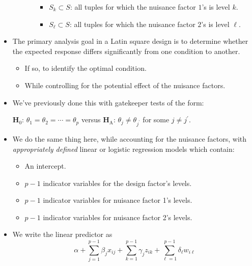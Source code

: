 \begin{itemize}
\begin{itemize}
\begin{itemize}
\begin{itemize}
                                          \item $ S_k\subset S $: all tuples for which the nuisance factor $ 1 $'s is level $ k $.
                                          \item $ S_\ell\subset S $: all tuples for which the nuisance factor $ 2 $'s is level $ \ell $.
                                    \end{itemize}
                        \end{itemize}
            \end{itemize}
      \item The primary analysis goal in a Latin square design is to determine whether the expected response differs significantly
            from one condition to another.
            \begin{itemize}
                  \item If so, to identify the optimal condition.
                  \item While controlling for the potential effect of the nuisance factors.
            \end{itemize}
      \item We've previously done this with gatekeeper tests of the form:
            \begin{tightcenter}
                  $ \mathbf{H}_0 $: $ \theta_1=\theta_2=\cdots=\theta_p $ versus $ \mathbf{H}_\text{A} $: $ \theta_j\ne \theta_{j^\prime} $ for some $ j\ne j^\prime $.
            \end{tightcenter}
      \item We do the same thing here, while accounting for the nuisance factors, with \emph{appropriately defined} linear
            or logistic regression models which contain:
            \begin{itemize}
                  \item An intercept.
                  \item $ p-1 $ indicator variables for the design factor's levels.
                  \item $ p-1 $ indicator variables for nuisance factor 1's levels.
                  \item $ p-1 $ indicator variables for nuisance factor 2's levels.
            \end{itemize}
      \item We write the linear predictor as
            \[ \alpha+\sum_{j=1}^{p-1} \beta_j x_{ij}+\sum_{k=1}^{p-1} \gamma_j z_{ik}+\sum_{\ell=1}^{p-1} \delta_\ell w_{i\ell} \]

\end{itemize}
